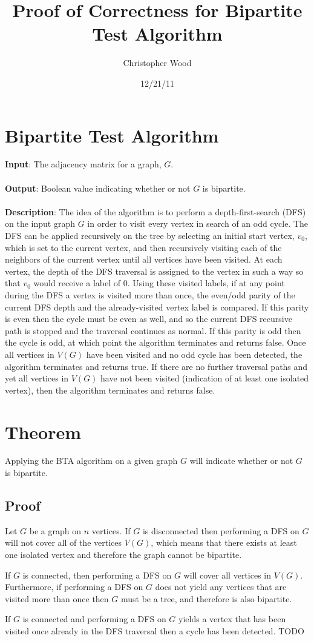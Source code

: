 \documentclass[a4paper,10pt]{article}
\title{Proof of Correctness for Bipartite Test Algorithm}
\author{Christopher Wood}
\date{12/21/11}
\begin{document}
\maketitle

\section{Bipartite Test Algorithm}
{\bf Input}: The adjacency matrix for a graph, $G$. \\ \\
{\bf Output}: Boolean value indicating whether or not $G$ is bipartite. \\ \\
{\bf Description}: The idea of the algorithm is to perform a depth-first-search (DFS) on the input graph $G$ in order to visit every vertex in search of an odd cycle. The DFS can be applied recursively on the tree by selecting an initial start vertex, $v_{0}$, which is set to the current vertex, and then recursively visiting each of the neighbors of the current vertex until all vertices have been visited. At each vertex, the depth of the DFS traversal is assigned to the vertex in such a way so that $v_{0}$ would receive a label of $0$. Using these visited labels, if at any point during the DFS a vertex is visited more than once, the even/odd parity of the current DFS depth and the already-visited vertex label is compared. If this parity is even then the cycle must be even as well, and so the current DFS recursive path is stopped and the traversal continues as normal. If this parity is odd then the cycle is odd, at which point the algorithm terminates and returns false. Once all vertices in $V(G)$ have been visited and no odd cycle has been detected, the algorithm terminates and returns true. If there are no further traversal paths and yet all vertices in $V(G)$ have not been visited (indication of at least one isolated vertex), then the algorithm terminates and returns false.

\section{Theorem}
Applying the BTA algorithm on a given graph $G$ will indicate whether or not $G$ is bipartite.

\subsection{Proof}
Let $G$ be a graph on $n$ vertices. If $G$ is disconnected then performing a DFS on $G$ will not cover all of the vertices $V(G)$, which means that there exists at least one isolated vertex and therefore the graph cannot be bipartite. 

If $G$ is connected, then performing a DFS on $G$ will cover all vertices in $V(G)$. Furthermore, if performing a DFS on $G$ does not yield any vertices that are visited more than once then $G$ must be a tree, and therefore is also bipartite. 

If $G$ is connected and performing a DFS on $G$ yields a vertex that has been visited once already in the DFS traversal then a cycle has been detected. TODO

\end{document}
